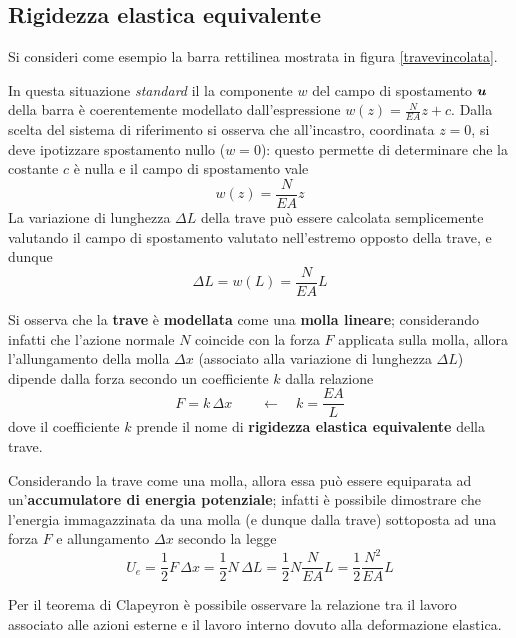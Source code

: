 	\subsection{Rigidezza elastica equivalente}
		Si consideri come esempio la barra rettilinea mostrata in figura \ref{travevincolata}.
		
		In questa situazione \textit{standard} il la componente $w$ del campo di spostamento $\boldsymbol{u}$ della barra è coerentemente modellato dall'espressione $w(z) = \frac N{EA}z + c$. Dalla scelta del sistema di riferimento si osserva che all'incastro, coordinata $z=0$, si deve ipotizzare spostamento nullo ($w=0$): questo permette di determinare che la costante $c$ è nulla e il campo di spostamento vale
		\[ w(z) = \frac N{EA}z  \]
		La variazione di lunghezza $\Delta L$ della trave può essere calcolata semplicemente valutando il campo di spostamento valutato nell'estremo opposto della trave, e dunque
		\[ \Delta L = w(L) = \frac{N}{EA}L \]
		
		\begin{concetto}
			Si osserva che la \textbf{trave} è \textbf{modellata} come una \textbf{molla lineare}; considerando infatti che l'azione normale $N$ coincide con la forza $F$ applicata sulla molla, allora l'allungamento della molla $\Delta x$ (associato alla variazione di lunghezza $\Delta L$) dipende dalla forza secondo un coefficiente $k$ dalla relazione
			\begin{equation}
				F = k\, \Delta x \qquad \leftarrow \quad k = \frac {EA} L
			\end{equation}
			dove il coefficiente $k$ prende il nome di \textbf{rigidezza elastica equivalente} della trave.
		\end{concetto}
		Considerando la trave come una molla, allora essa può essere equiparata ad un'\textbf{accumulatore di energia potenziale}; infatti è possibile dimostrare che l'energia immagazzinata da una molla (e dunque dalla trave) sottoposta ad una forza $F$ e allungamento $\Delta x$ secondo la legge
		\begin{equation}
			U_e = \frac 1 2 F\, \Delta x = \frac 1 2 N \, \Delta L = \frac 1 2 N \frac N{EA}L  = \frac 1 2 \frac{N^2}{EA}L
		\end{equation}
		\begin{osservazione}
			Per il teorema di Clapeyron è possibile osservare la relazione tra il lavoro associato alle azioni esterne e il lavoro interno dovuto alla deformazione elastica.
		\end{osservazione}
	
